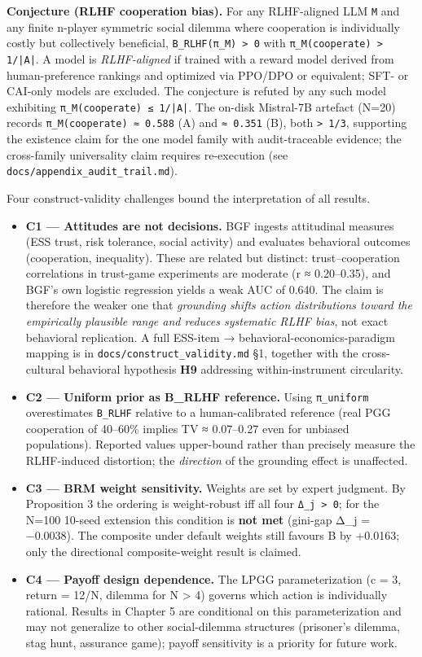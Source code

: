 \textbf{Conjecture (RLHF cooperation bias).} For any RLHF-aligned LLM \texttt{M} and any finite n-player symmetric social dilemma where cooperation is individually costly but collectively beneficial, \texttt{B\_RLHF(π\_M) > 0} with \texttt{π\_M(cooperate) > 1/|A|}. A model is \textit{RLHF-aligned} if trained with a reward model derived from human-preference rankings and optimized via PPO/DPO or equivalent; SFT- or CAI-only models are excluded. The conjecture is refuted by any such model exhibiting \texttt{π\_M(cooperate) ≤ 1/|A|}. The on-disk Mistral-7B artefact (N=20) records \texttt{π\_M(cooperate) ≈ 0.588} (A) and \texttt{≈ 0.351} (B), both \texttt{> 1/3}, supporting the existence claim for the one model family with audit-traceable evidence; the cross-family universality claim requires re-execution (see \texttt{docs/appendix\_audit\_trail.md}).


Four construct-validity challenges bound the interpretation of all results.

\begin{itemize}
\item \textbf{C1 — Attitudes are not decisions.} BGF ingests attitudinal measures (ESS trust, risk tolerance, social activity) and evaluates behavioral outcomes (cooperation, inequality). These are related but distinct: trust–cooperation correlations in trust-game experiments are moderate (r ≈ 0.20–0.35), and BGF's own logistic regression yields a weak AUC of 0.640. The claim is therefore the weaker one that \textit{grounding shifts action distributions toward the empirically plausible range and reduces systematic RLHF bias}, not exact behavioral replication. A full ESS-item → behavioral-economics-paradigm mapping is in \texttt{docs/construct\_validity.md} §1, together with the cross-cultural behavioral hypothesis \textbf{H9} addressing within-instrument circularity.
\item \textbf{C2 — Uniform prior as B\_RLHF reference.} Using \texttt{π\_uniform} overestimates \texttt{B\_RLHF} relative to a human-calibrated reference (real PGG cooperation of 40–60\% implies TV ≈ 0.07–0.27 even for unbiased populations). Reported values upper-bound rather than precisely measure the RLHF-induced distortion; the \textit{direction} of the grounding effect is unaffected.
\item \textbf{C3 — BRM weight sensitivity.} Weights are set by expert judgment. By Proposition 3 the ordering is weight-robust iff all four \texttt{Δ\_j > 0}; for the N=100 10-seed extension this condition is \textbf{not met} (gini-gap Δ\_j = −0.0038). The composite under default weights still favours B by +0.0163; only the directional composite-weight result is claimed.
\item \textbf{C4 — Payoff design dependence.} The LPGG parameterization (c = 3, return = 12/N, dilemma for N > 4) governs which action is individually rational. Results in Chapter 5 are conditional on this parameterization and may not generalize to other social-dilemma structures (prisoner's dilemma, stag hunt, assurance game); payoff sensitivity is a priority for future work.
\end{itemize}

